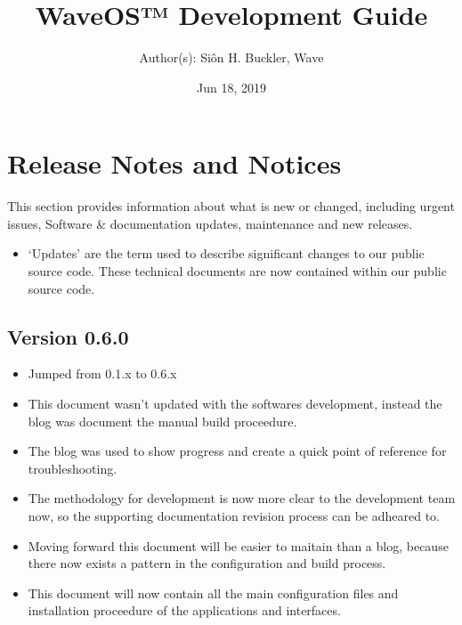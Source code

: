 \documentclass[letterpaper,10pt,openany,oneside,english]{sphinxmanual}
\title{WaveOS™ Development Guide}
\date{Jun 18, 2019}
\author{Author(s): Siôn H. Buckler, Wave}
\begin{document}
\maketitle
\sphinxtableofcontents
{}\label{\detokenize{index::doc}}




\chapter{Release Notes and Notices}
\label{\detokenize{releasenotes:release-notes-and-notices}}\label{\detokenize{releasenotes::doc}}
This section provides information about what is new or changed, including urgent issues, Software \& documentation updates, maintenance and new releases.
\begin{itemize}
\item {} 
‘Updates’ are the term used to describe significant changes to our public source code. These technical documents are now contained within our public source code.

\end{itemize}


\section{Version 0.6.0}
\label{\detokenize{releasenotes:version-0-6-0}}\begin{itemize}
\item {} 
Jumped from 0.1.x to 0.6.x

\item {} 
This document wasn’t updated with the softwares development, instead the blog was document the manual build proceedure.

\item {} 
The blog was used to show progress and create a quick point of reference for troubleshooting.

\item {} 
The methodology for development is now more clear to the development team now, so the supporting documentation revision process can be adheared to.

\item {} 
Moving forward this document will be easier to maitain than a blog, because there now exists a pattern in the configuration and build process.

\item {} 
This document will now contain all the main configuration files and installation proceedure of the applications and interfaces.

\end{itemize}
\end{document}
